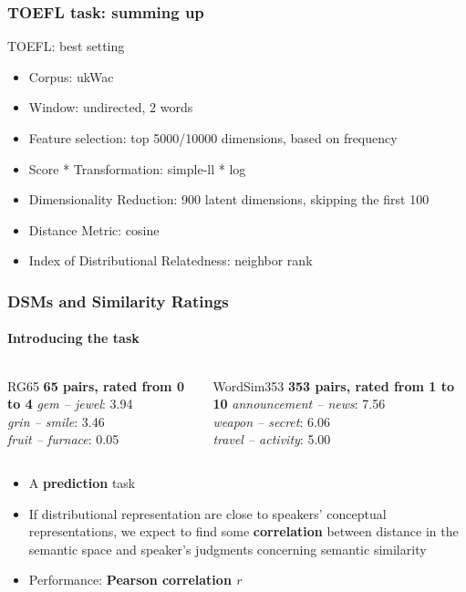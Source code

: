 \documentclass[t]{beamer} %
\begin{document}
\begin{frame}
  \frametitle{TOEFL task: summing up}
  \begin{exampleblock}{TOEFL: best setting}
    \begin{itemize}\footnotesize
    \item Corpus: ukWac
    \item Window: undirected, 2 words 
    \item Feature selection: top 5000/10000 dimensions, based on frequency
    \item Score * Transformation: simple-ll * log
    \item Dimensionality Reduction: 900 latent dimensions, skipping the first 100
    \item Distance Metric: cosine
    \item Index of Distributional Relatedness: neighbor rank
    \end{itemize}
  \end{exampleblock}   
  
\end{frame}


\begin{frame}
  \frametitle{DSMs and Similarity Ratings}
  \framesubtitle{Introducing the task}

  \ungap[1]
  \begin{columns}
    \begin{column}{0.5\textwidth}
      \begin{exampleblock}{RG65}
        \textbf{65 pairs, rated from 0 to 4}
        \textit{gem -- jewel}: 3.94 \\
        \textit{grin -- smile}:  3.46 \\
        \textit{fruit -- furnace}: 0.05 \\
      \end{exampleblock}
    \end{column}
    \begin{column}{0.5\textwidth}
      
      
      \begin{exampleblock}  {WordSim353}
        \textbf{353 pairs, rated from 1 to 10}
        \textit{announcement -- news}: 7.56 \\
        \textit{weapon -- secret}:  6.06 \\
        \textit{travel -- activity}: 5.00 \\
      \end{exampleblock}
    \end{column}
  \end{columns}
  \begin{itemize}
  \item A \textbf{prediction} task
  \item If distributional representation are close to  speakers' conceptual representations, we expect to find some \textbf{correlation} between distance in the semantic space and speaker's judgments concerning semantic similarity
  \item Performance: \textbf{Pearson correlation $r$}
  \end{itemize}

\end{frame}
\end{document}
